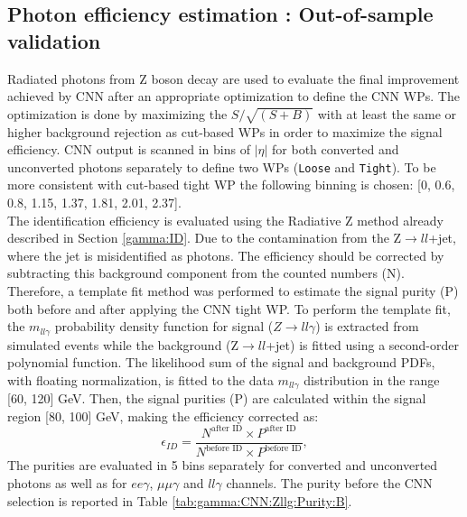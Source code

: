 \subsection{Photon efficiency estimation : Out-of-sample validation}
\label{gamma:CNN:Zllg}
Radiated photons from Z boson decay are used to evaluate the final improvement achieved by CNN after an appropriate optimization to define the CNN WPs. The optimization is done by maximizing the $S/\sqrt{(S+B)}$ with at least the same or higher background rejection as cut-based WPs in order to maximize the signal efficiency. CNN output is scanned in bins of $|\eta|$ for both converted and unconverted photons separately to define two WPs (\texttt{Loose} and \texttt{Tight}). To be more consistent with cut-based tight WP the following binning is chosen: [0, 0.6, 0.8, 1.15, 1.37, 1.81, 2.01, 2.37]. \\
The identification efficiency is evaluated using the Radiative Z method already described in Section \ref{gamma:ID}. Due to the contamination from the Z$\rightarrow ll$+jet, where the jet is misidentified as photons. The efficiency should be corrected by subtracting this background component from the counted numbers (N). Therefore, a template fit method was performed to estimate the signal purity (P) both before and after applying the CNN tight WP. To perform the template fit, the $m_{ll\gamma}$ probability density function for signal ($Z\rightarrow ll\gamma$) is extracted from simulated events while the background (Z$\rightarrow ll$+jet) is fitted using a second-order polynomial function. The likelihood sum of the signal and background PDFs, with floating normalization, is fitted to the data $m_{ll\gamma}$ distribution in the range [60, 120] GeV. Then, the signal purities (P) are calculated within the signal region [80, 100] GeV, making the efficiency corrected as: 
\begin{equation}
    \epsilon_{ID} = \frac{N^{\text{after ID}}\times P^{\text{after ID}}}{N^{\text{before ID}} \times P^{\text{before ID}}},
\end{equation}
The purities are evaluated in 5 \eT bins separately for converted and unconverted photons as well as for $ee\gamma$, $\mu\mu\gamma$ and $ll\gamma$ channels. The purity before the CNN selection is reported in Table \ref{tab:gamma:CNN:Zllg:Purity:B}. \\
